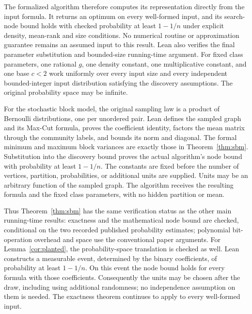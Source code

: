 \documentclass[11pt,a4paper]{article}
\theoremstyle{definition}
\theoremstyle{remark}
\begin{document}
The formalized algorithm therefore computes its representation directly
from the input formula. It returns an optimum on every well-formed input,
and its search-node bound holds with checked probability at least $1-1/n$
under explicit density, mean-rank and size conditions. No numerical routine
or approximation guarantee remains an assumed input to this result.
Lean also verifies the final parameter substitution and bounded-size
running-time argument. For fixed class parameters, one rational $g$, one
density constant, one multiplicative constant, and one base $c<2$ work
uniformly over every input size and every independent bounded-integer
input distribution satisfying the discovery assumptions. The original
probability space may be infinite.

For the stochastic block model, the original sampling law is a product of
Bernoulli distributions, one per unordered pair. Lean defines the sampled
graph and its Max-Cut formula, proves the coefficient identity, factors the
mean matrix through the community labels, and bounds its norm and diagonal.
The formal minimum and maximum block variances are exactly those in
Theorem~\ref{thm:sbm}. Substitution into the discovery bound proves the
actual algorithm's node bound with probability at least $1-1/n$.
The constants are fixed before the number of vertices, partition,
probabilities, or additional units are supplied. Units may be an arbitrary
function of the sampled graph. The algorithm receives the resulting
formula and the fixed class parameters, with no hidden partition or mean.

Thus Theorem~\ref{thm:sbm} has the same verification status as the other main
running-time results: exactness and the mathematical node bound are checked,
conditional on the two recorded published probability estimates; polynomial
bit-operation overhead and space use the conventional paper arguments.
For Lemma~\ref{cor:planted}, the probability-space translation is checked
as well. Lean constructs a measurable event, determined by the binary
coefficients, of probability at least $1-1/n$. On this event the node bound
holds for every formula with those coefficients. Consequently the units
may be chosen after the draw, including using additional randomness;
no independence assumption on them is needed. The exactness theorem
continues to apply to every well-formed input.
\end{document}
